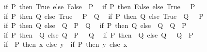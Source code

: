 \begin{isabellebody}
\ \ {\isachardoublequoteopen}{\isacharparenleft}{\kern0pt}if\ P\ then\ True\ else\ False{\isacharparenright}{\kern0pt}\ {\isacharequal}{\kern0pt}\ P{\isachardoublequoteclose}\isanewline
\ \ {\isachardoublequoteopen}{\isacharparenleft}{\kern0pt}if\ P\ then\ False\ else\ True{\isacharparenright}{\kern0pt}\ {\isacharequal}{\kern0pt}\ {\isacharparenleft}{\kern0pt}{\isasymnot}\ P{\isacharparenright}{\kern0pt}{\isachardoublequoteclose}\isanewline
\ \ {\isachardoublequoteopen}{\isacharparenleft}{\kern0pt}if\ P\ then\ Q\ else\ True{\isacharparenright}{\kern0pt}\ {\isacharequal}{\kern0pt}\ {\isacharparenleft}{\kern0pt}{\isacharparenleft}{\kern0pt}{\isasymnot}\ P{\isacharparenright}{\kern0pt}\ {\isasymor}\ Q{\isacharparenright}{\kern0pt}{\isachardoublequoteclose}\isanewline
\ \ {\isachardoublequoteopen}{\isacharparenleft}{\kern0pt}if\ P\ then\ Q\ else\ True{\isacharparenright}{\kern0pt}\ {\isacharequal}{\kern0pt}\ {\isacharparenleft}{\kern0pt}Q\ {\isasymor}\ {\isacharparenleft}{\kern0pt}{\isasymnot}\ P{\isacharparenright}{\kern0pt}{\isacharparenright}{\kern0pt}{\isachardoublequoteclose}\isanewline
\ \ {\isachardoublequoteopen}{\isacharparenleft}{\kern0pt}if\ P\ then\ Q\ else\ {\isasymnot}\ Q{\isacharparenright}{\kern0pt}\ {\isacharequal}{\kern0pt}\ {\isacharparenleft}{\kern0pt}P\ {\isacharequal}{\kern0pt}\ Q{\isacharparenright}{\kern0pt}{\isachardoublequoteclose}\isanewline
\ \ {\isachardoublequoteopen}{\isacharparenleft}{\kern0pt}if\ P\ then\ Q\ else\ {\isasymnot}\ Q{\isacharparenright}{\kern0pt}\ {\isacharequal}{\kern0pt}\ {\isacharparenleft}{\kern0pt}Q\ {\isacharequal}{\kern0pt}\ P{\isacharparenright}{\kern0pt}{\isachardoublequoteclose}\isanewline
\ \ {\isachardoublequoteopen}{\isacharparenleft}{\kern0pt}if\ P\ then\ {\isasymnot}\ Q\ else\ Q{\isacharparenright}{\kern0pt}\ {\isacharequal}{\kern0pt}\ {\isacharparenleft}{\kern0pt}P\ {\isacharequal}{\kern0pt}\ {\isacharparenleft}{\kern0pt}{\isasymnot}\ Q{\isacharparenright}{\kern0pt}{\isacharparenright}{\kern0pt}{\isachardoublequoteclose}\isanewline
\ \ {\isachardoublequoteopen}{\isacharparenleft}{\kern0pt}if\ P\ then\ {\isasymnot}\ Q\ else\ Q{\isacharparenright}{\kern0pt}\ {\isacharequal}{\kern0pt}\ {\isacharparenleft}{\kern0pt}{\isacharparenleft}{\kern0pt}{\isasymnot}\ Q{\isacharparenright}{\kern0pt}\ {\isacharequal}{\kern0pt}\ P{\isacharparenright}{\kern0pt}{\isachardoublequoteclose}\isanewline
\ \ {\isachardoublequoteopen}{\isacharparenleft}{\kern0pt}if\ {\isasymnot}\ P\ then\ x\ else\ y{\isacharparenright}{\kern0pt}\ {\isacharequal}{\kern0pt}\ {\isacharparenleft}{\kern0pt}if\ P\ then\ y\ else\ x{\isacharparenright}{\kern0pt}{\isachardoublequoteclose}\isanewline

\end{isabellebody}
